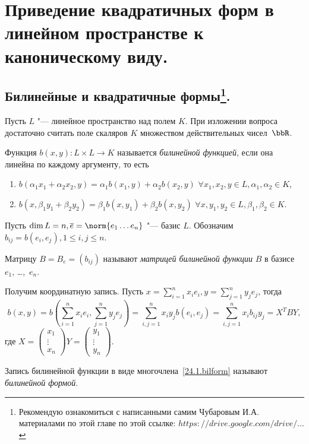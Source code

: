 \chapter{Приведение квадратичных форм в линейном пространстве к каноническому виду.}\label{chapter25}

\section[Билинейные и квадратичные формы.]{Билинейные и квадратичные формы\footnote{Рекомендую ознакомиться с написанными самим Чубаровым И.А. материалами по этой главе по этой ссылке: \href{https://drive.google.com/drive/u/0/folders/0BzuzEyNkpwYDcFhhV1l2N1lhY2s}{$https://drive.google.com/drive/...$}}.}
Пусть $L$ "--- линейное пространство над полем $K$. При изложении вопроса достаточно считать поле скаляров $K$ множеством действительных чисел~$\bbR$.
\begin{defn}  
Функция $b(x,y)\colon L\times L\rightarrow K$ называется \textit{билинейной функцией}, если она линейна по каждому аргументу, то есть
\begin{enumerate}
\item 
$b(\alpha_1 x_1+\alpha_2 x_2,y)=\alpha_1 b(x_1,y)+\alpha_2 b(x_2,y)$ $\forall x_1,x_2,y \in L, \alpha_1,\alpha_2 \in K$,
\item 
$b(x,\beta_1 y_1+\beta_2 y_2)=\beta_1 b(x,y_1)+\beta_2 b(x,y_2)$  $\forall x,y_1,y_2 \in L, \beta_1,\beta_2 \in K$.
\end{enumerate}
\end{defn}
Пусть $\dim L=n, \overline{e}=\norm{e_1 \ldots e_n}$ "--- базис $L$. Обозначим $b_{ij}=b(e_i,e_j), 1\le i,j \le n$.
\begin{defn}
Матрицу $B=B_e=(b_{ij})$ называют \textit{матрицей билинейной функции} $B$ в базисе $e_1$, \ldots,~$e_n$.
\end{defn}
  
Получим координатную запись. Пусть $x=\sum\limits_{i=1}^nx_ie_i,y=\sum\limits_{j=1}^ny_je_j$, тогда
\begin{equation}\label{24.1.bilform}
b(x,y)=b(\sum_{i=1}^nx_ie_i,\sum_{j=1}^ny_je_j)=\sum_{i,j=1}^nx_iy_jb(e_i,e_j)=\sum_{i,j=1}^nx_ib_{ij}y_j=X^TBY,
\end{equation}
где $X=\begin{pmatrix}
x_1 \\ \vdots \\ x_n
\end{pmatrix} Y=\begin{pmatrix}
y_1 \\ \vdots \\ y_n
\end{pmatrix}$.
\begin{defn}
Запись билинейной функции в виде многочлена~\eqref{24.1.bilform} называют \textit{билинейной формой}.
\end{defn}

